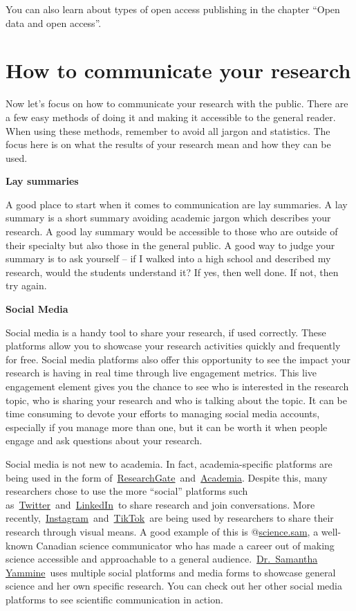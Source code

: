 \documentclass[
]{book}
\begin{document}
You can also learn about types of open access publishing in the chapter ``Open data and open access''.

\hypertarget{how-to-communicate-your-research}{%
\section{\texorpdfstring{\textbf{How to communicate your research}}{How to communicate your research}}\label{how-to-communicate-your-research}}

Now let's focus on how to communicate your research with the public. There are a few easy methods of doing it and making it accessible to the general reader. When using these methods, remember to avoid all jargon and statistics. The focus here is on what the results of your research mean and how they can be used.

\textbf{Lay summaries}

A good place to start when it comes to communication are lay summaries. A lay summary is a short summary avoiding academic jargon which describes your research. A good lay summary would be accessible to those who are outside of their specialty but also those in the general public. A good way to judge your summary is to ask yourself -- if I walked into a high school and described my research, would the students understand it? If yes, then well done. If not, then try again.

\textbf{Social Media}

Social media is a handy tool to share your research, if used correctly. These platforms allow you to showcase your research activities quickly and frequently for free. Social media platforms also offer this opportunity to see the impact your research is having in real time through live engagement metrics. This live engagement element gives you the chance to see who is interested in the research topic, who is sharing your research and who is talking about the topic. It can be time consuming to devote your efforts to managing social media accounts, especially if you manage more than one, but it can be worth it when people engage and ask questions about your research.

Social media is not new to academia. In fact, academia-specific platforms are being used in the form of~\href{https://www.researchgate.net/}{ResearchGate}~and~\href{https://www.academia.edu/}{Academia}. Despite this, many researchers chose to use the more ``social'' platforms such as~\href{http://www.twitter.com/}{Twitter}~and~\href{http://www.linkedin.com/}{LinkedIn}~to share research and join conversations. More recently,~\href{http://www.instagram.com/}{Instagram}~and~\href{https://www.tiktok.com/en}{TikTok}~are being used by researchers to share their research through visual means. A good example of this is @\href{https://www.instagram.com/science.sam/}{science.sam}, a well-known Canadian science communicator who has made a career out of making science accessible and approachable to a general audience.~\href{https://www.samanthayammine.com/}{Dr.~Samantha Yammine}~uses multiple social platforms and media forms to showcase general science and her own specific research. You can check out her other social media platforms to see scientific communication in action.
\end{document}
